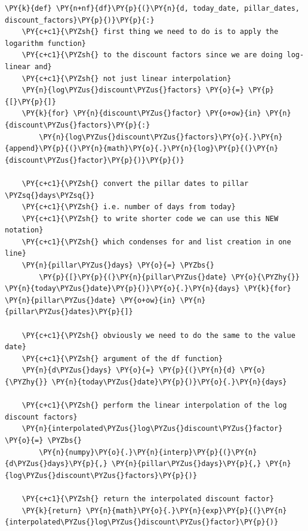 \begin{tcolorbox}[breakable, size=fbox, boxrule=1pt, pad at break*=1mm,colback=cellbackground, colframe=cellborder]
\begin{Verbatim}[commandchars=\\\{\}]
\PY{k}{def} \PY{n+nf}{df}\PY{p}{(}\PY{n}{d, today_date, pillar_dates, discount_factors}\PY{p}{)}\PY{p}{:}
    \PY{c+c1}{\PYZsh{} first thing we need to do is to apply the logarithm function}
    \PY{c+c1}{\PYZsh{} to the discount factors since we are doing log-linear and}
    \PY{c+c1}{\PYZsh{} not just linear interpolation}
    \PY{n}{log\PYZus{}discount\PYZus{}factors} \PY{o}{=} \PY{p}{[}\PY{p}{]}
    \PY{k}{for} \PY{n}{discount\PYZus{}factor} \PY{o+ow}{in} \PY{n}{discount\PYZus{}factors}\PY{p}{:}
        \PY{n}{log\PYZus{}discount\PYZus{}factors}\PY{o}{.}\PY{n}{append}\PY{p}{(}\PY{n}{math}\PY{o}{.}\PY{n}{log}\PY{p}{(}\PY{n}{discount\PYZus{}factor}\PY{p}{)}\PY{p}{)}
    
    \PY{c+c1}{\PYZsh{} convert the pillar dates to pillar \PYZsq{}days\PYZsq{}}
    \PY{c+c1}{\PYZsh{} i.e. number of days from today}
    \PY{c+c1}{\PYZsh{} to write shorter code we can use this NEW notation}
    \PY{c+c1}{\PYZsh{} which condenses for and list creation in one line}
    \PY{n}{pillar\PYZus{}days} \PY{o}{=} \PYZbs{}
        \PY{p}{[}\PY{p}{(}\PY{n}{pillar\PYZus{}date} \PY{o}{\PYZhy{}} \PY{n}{today\PYZus{}date}\PY{p}{)}\PY{o}{.}\PY{n}{days} \PY{k}{for} \PY{n}{pillar\PYZus{}date} \PY{o+ow}{in} \PY{n}{pillar\PYZus{}dates}\PY{p}{]}
    
    \PY{c+c1}{\PYZsh{} obviously we need to do the same to the value date}
    \PY{c+c1}{\PYZsh{} argument of the df function}
    \PY{n}{d\PYZus{}days} \PY{o}{=} \PY{p}{(}\PY{n}{d} \PY{o}{\PYZhy{}} \PY{n}{today\PYZus{}date}\PY{p}{)}\PY{o}{.}\PY{n}{days}
    
    \PY{c+c1}{\PYZsh{} perform the linear interpolation of the log discount factors}
    \PY{n}{interpolated\PYZus{}log\PYZus{}discount\PYZus{}factor} \PY{o}{=} \PYZbs{}
        \PY{n}{numpy}\PY{o}{.}\PY{n}{interp}\PY{p}{(}\PY{n}{d\PYZus{}days}\PY{p}{,} \PY{n}{pillar\PYZus{}days}\PY{p}{,} \PY{n}{log\PYZus{}discount\PYZus{}factors}\PY{p}{)}
    
    \PY{c+c1}{\PYZsh{} return the interpolated discount factor}
    \PY{k}{return} \PY{n}{math}\PY{o}{.}\PY{n}{exp}\PY{p}{(}\PY{n}{interpolated\PYZus{}log\PYZus{}discount\PYZus{}factor}\PY{p}{)}
\end{Verbatim}
\end{tcolorbox}

